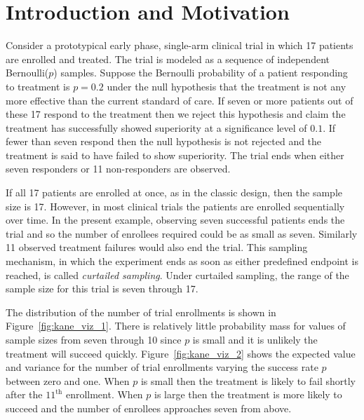 \documentclass[sii]{ipart}
\begin{document}
\begin{frontmatter}
\begin{keyword}[class=AMS]
\end{keyword}

\begin{keyword}
\end{keyword}

 
\end{frontmatter}

\section{Introduction and Motivation}

Consider a prototypical early phase, single-arm clinical trial in which 17 patients
are enrolled and treated. The trial is modeled as a sequence of independent Bernoulli($p$) samples. Suppose the Bernoulli probability of a patient 
responding to treatment is $p=0.2$ under the null hypothesis that the treatment is not any more effective than the current standard of care.
If seven or more patients out of these 17 respond to the treatment then we 
reject this hypothesis and claim the treatment has successfully showed superiority at 
a significance level of $0.1$.  If fewer than seven respond then the null 
hypothesis is not rejected and the treatment is said to have failed to show superiority. The trial ends when 
either seven responders or 11 non-responders are observed.

If all 17 patients are enrolled at once, as in the classic
design, then the sample size is 17. However, in most clinical trials the
patients are enrolled sequentially over time.
In the present example, observing seven
successful patients ends the trial and so the number of enrollees required
could be as small as seven. Similarly 11
observed treatment failures would also end the trial. This sampling mechanism, in
which the experiment ends as soon as either predefined endpoint is reached, is
called {\em curtailed sampling}. Under curtailed sampling, the range of the
sample size for this trial is seven through 17.

The distribution of the number of trial enrollments is shown in 
Figure~\ref{fig:kane_viz_1}. There is relatively little probability mass
for values of sample sizes from seven through 10 since $p$ is small and it 
is unlikely the treatment will succeed quickly.
Figure~\ref{fig:kane_viz_2} shows the expected value and variance for the
number of trial enrollments varying the success rate $p$ between zero and one. When $p$ is small then the treatment
is likely to fail shortly after the $11^{\text{th}}$ enrollment.
When $p$ is large then the treatment is more likely to succeed and the 
number of enrollees approaches seven from above. 
\end{document}
